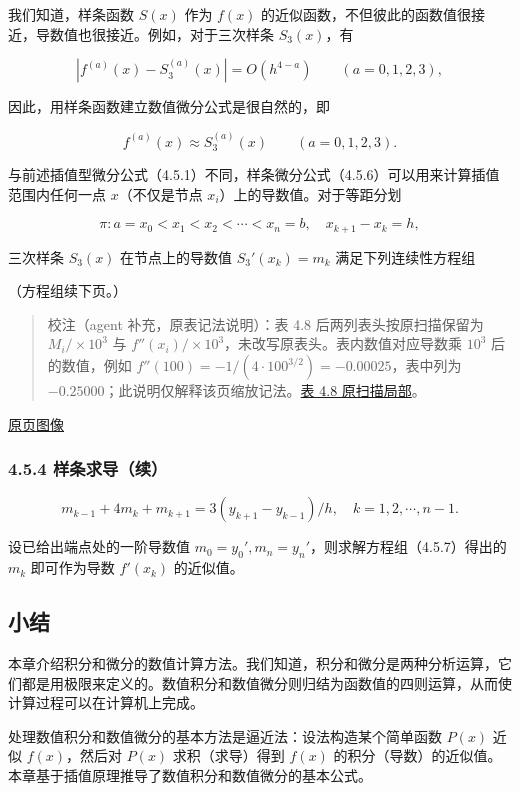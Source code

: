 \documentclass[
  10pt,
  fontset=fandol]{ctexart}
\begin{document}
我们知道，样条函数 \(S(x)\) 作为 \(f(x)\) 的近似函数，不但彼此的函数值很接近，导数值也很接近。例如，对于三次样条 \(S_3(x)\)，有

\[
|f^{(a)}(x)-S_3^{(a)}(x)|=O(h^{4-a})\qquad(a=0,1,2,3),
\]

因此，用样条函数建立数值微分公式是很自然的，即

\[
f^{(a)}(x)\approx S_3^{(a)}(x)\qquad(a=0,1,2,3).
\tag{4.5.6}
\]

与前述插值型微分公式（4.5.1）不同，样条微分公式（4.5.6）可以用来计算插值范围内任何一点 \(x\)（不仅是节点 \(x_i\)）上的导数值。对于等距分划

\[
\pi:a=x_0<x_1<x_2<\cdots<x_n=b,\quad x_{k+1}-x_k=h,
\]

三次样条 \(S_3(x)\) 在节点上的导数值 \(S_3'(x_k)=m_k\) 满足下列连续性方程组

（方程组续下页。）

\begin{quote}
校注（agent 补充，原表记法说明）：表 4.8 后两列表头按原扫描保留为 \(M_i/\times10^3\) 与 \(f''(x_i)/\times10^3\)，未改写原表头。表内数值对应导数乘 \(10^3\) 后的数值，例如 \(f''(100)=-1/(4\cdot100^{3/2})=-0.00025\)，表中列为 \(-0.25000\)；此说明仅解释该页缩放记法。\href{../assets/ch04b/review-table-4-8.png}{表 4.8 原扫描局部}。
\end{quote}

\href{../../source-images/pdf-117.jpeg}{原页图像}

\subsubsection{4.5.4 样条求导（续）}\label{ux6837ux6761ux6c42ux5bfcux7eed}

\[
m_{k-1}+4m_k+m_{k+1}=3(y_{k+1}-y_{k-1})/h,\quad k=1,2,\cdots,n-1.
\tag{4.5.7}
\]

设已给出端点处的一阶导数值 \(m_0=y_0',m_n=y_n'\)，则求解方程组（4.5.7）得出的 \(m_k\) 即可作为导数 \(f'(x_k)\) 的近似值。

\subsection{小结}\label{ux5c0fux7ed3}

本章介绍积分和微分的数值计算方法。我们知道，积分和微分是两种分析运算，它们都是用极限来定义的。数值积分和数值微分则归结为函数值的四则运算，从而使计算过程可以在计算机上完成。

处理数值积分和数值微分的基本方法是逼近法：设法构造某个简单函数 \(P(x)\) 近似 \(f(x)\)，然后对 \(P(x)\) 求积（求导）得到 \(f(x)\) 的积分（导数）的近似值。本章基于插值原理推导了数值积分和数值微分的基本公式。
\end{document}
